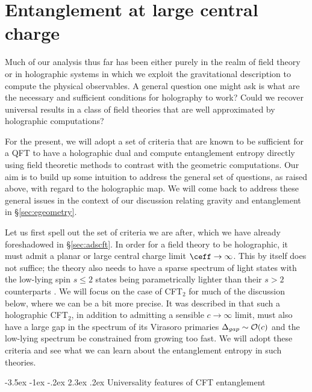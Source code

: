 \documentclass[12pt,openany]{book}
\makeatletter
\renewcommand\section{\@startsection {section}{1}{\z@}%
                                   {-3.5ex \@plus -1ex \@minus -.2ex}%
                                   {2.3ex \@plus.2ex}%
                                   {\normalfont\large\bfseries}}
\makeatother
\begin{document}
\chapter{Entanglement at large central charge}
\label{sec:largec}

Much of our analysis thus far has been either purely in the realm of field theory or in holographic systems in which we exploit the gravitational description to compute the physical observables.  A general question one might ask is what are the necessary and sufficient conditions for holography to work? Could we recover universal results in a class of field theories that are well approximated by holographic computations?

For the present, we will adopt a set of criteria that are known to be sufficient for a QFT to have a holographic dual and compute entanglement entropy directly using field theoretic methods to contrast with the geometric computations. Our aim is to build up some intuition to address the general set of questions, as  raised above,  with regard to the holographic map. We will come back to address these general issues in the context of our discussion relating gravity and entanglement in \S\ref{sec:egeometry}.

Let us first spell out the set of criteria we are after, which we have already foreshadowed in \S\ref{sec:adscft}. In order for a field theory to be holographic, it must admit a planar or large central charge limit $\ceff\to \infty$. This by itself does not suffice; the theory also needs to have a sparse spectrum of light states with the low-lying spin $s \leq 2$ states being parametrically lighter than their $s >2 $ counterparts \cite{Heemskerk:2009pn}.  We will focus on the case of CFT$_2$ for much of the discussion below, where we can be a bit more precise. It was described in \cite{Hartman:2014oaa} that such a holographic CFT$_2$, in addition to admitting a sensible $c\to\infty$ limit,
must also have a large gap in the spectrum of its Virasoro primaries $\Delta_{gap} \sim {\cal O}(c)$ and the low-lying spectrum be constrained from growing too fast. We will adopt these criteria and see what we can learn about the entanglement entropy in such theories.

\section{Universality features of CFT entanglement}
\label{sec:nhee}
\end{document}
